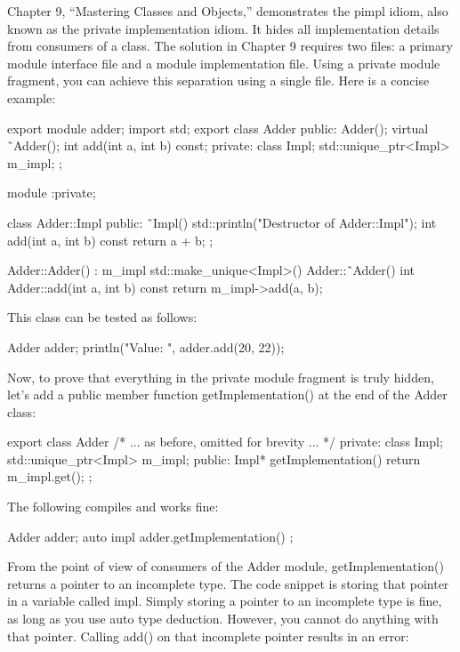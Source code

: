 Chapter 9, “Mastering Classes and Objects,” demonstrates the pimpl idiom, also known as the private implementation idiom. It hides all implementation details from consumers of a class. The solution in Chapter 9 requires two files: a primary module interface file and a module implementation file. Using a private module fragment, you can achieve this separation using a single file. Here is a concise example:

\begin{cpp}
export module adder;
import std;
export class Adder
{
    public:
    Adder();
    virtual ˜Adder();
    int add(int a, int b) const;
    private:
    class Impl;
    std::unique_ptr<Impl> m_impl;
};

module :private;

class Adder::Impl
{
    public:
    ˜Impl() { std::println("Destructor of Adder::Impl"); }
    int add(int a, int b) const { return a + b;}
};

Adder::Adder() : m_impl { std::make_unique<Impl>() } { }
Adder::˜Adder() {}
int Adder::add(int a, int b) const { return m_impl->add(a, b); }
\end{cpp}

This class can be tested as follows:

\begin{cpp}
Adder adder;
println("Value: {}", adder.add(20, 22));
\end{cpp}

Now, to prove that everything in the private module fragment is truly hidden, let’s add a public member function getImplementation() at the end of the Adder class:

\begin{cpp}
export class Adder
{
    /* ... as before, omitted for brevity ... */
    private:
        class Impl;
        std::unique_ptr<Impl> m_impl;
    public:
        Impl* getImplementation() { return m_impl.get(); }
};
\end{cpp}

The following compiles and works fine:

\begin{cpp}
Adder adder;
auto impl { adder.getImplementation() };
\end{cpp}

From the point of view of consumers of the Adder module, getImplementation() returns a pointer to an incomplete type. The code snippet is storing that pointer in a variable called impl. Simply storing a pointer to an incomplete type is fine, as long as you use auto type deduction. However, you cannot do anything with that pointer. Calling add() on that incomplete pointer results in an error:

